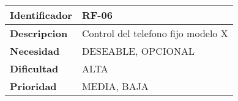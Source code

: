 \begin{center}
    \begin{tabular}{|p{2.6cm}|p{12cm}|}
    \hline
    \textbf{Identificador} & RF-06\\
    \hline
    \textbf{Descripcion} & Control del telefono fijo modelo X\\
    \hline
    \textbf{Necesidad} & DESEABLE, OPCIONAL\\
    \hline
    \textbf{Dificultad} & ALTA\\
    \hline
    \textbf{Prioridad} & MEDIA, BAJA\\
    \hline
    \end{tabular}
\end{center}
